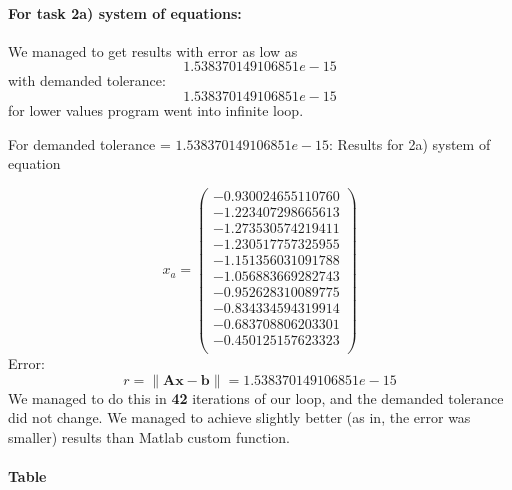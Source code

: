 \documentclass[12pt]{report}
\begin{document}
\paragraph{For task 2a) system of equations:}
We managed to get results with error as low as
\[ 1.538370149106851e-15 \] with demanded tolerance:
\[ 1.538370149106851e-15 \]
for lower values program went into infinite loop.

For demanded tolerance = $1.538370149106851e-15$:
Results for 2a) system of equation

\[ x_a = \left( \begin{array}{cc}
-0.930024655110760 \\
-1.223407298665613 \\
-1.273530574219411 \\
-1.230517757325955 \\
-1.151356031091788 \\
-1.056883669282743 \\
-0.952628310089775 \\
-0.834334594319914 \\
-0.683708806203301 \\
-0.450125157623323 \\
\end{array} \right)
\]
Error:
\[ r = \| \mathbf{A}\mathbf{x} - \mathbf{b}\| = 1.538370149106851e-15 \]
We managed to do this in \textbf{42} iterations of our loop, and the demanded tolerance did not change.
We managed to achieve slightly better (as in, the error was smaller) results than Matlab custom function.

\paragraph{Table}
\end{document}
